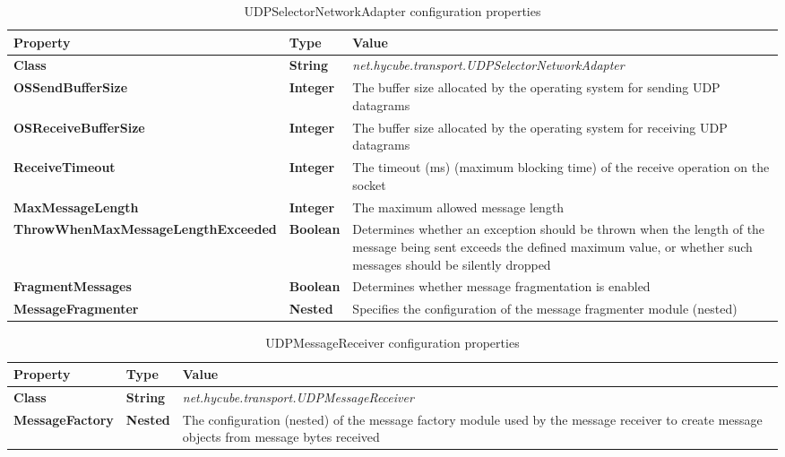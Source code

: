 \begin{table}
\scriptsize
\begin{center}
\begin{tabular}{p{5.0cm} p{1.0cm} p{8.5cm}}
	\hline
	\textbf{Property}							& \textbf{Type}					& \textbf{Value}					\\[1mm]
    \hline
	\textbf{Class}								& \textbf{String}				& \textit{net.hycube.transport.UDPSelectorNetworkAdapter}							\\[1.5mm]	
	\textbf{OSSendBufferSize}					& \textbf{Integer}				& The buffer size allocated by the operating system for sending UDP datagrams		\\[1.5mm]	
	\textbf{OSReceiveBufferSize}				& \textbf{Integer}				& The buffer size allocated by the operating system for receiving UDP datagrams		\\[1.5mm]	
	\textbf{ReceiveTimeout}						& \textbf{Integer}				& The timeout (ms) (maximum blocking time) of the receive operation on the socket		\\[1.5mm]	
	\textbf{MaxMessageLength}					& \textbf{Integer}				& The maximum allowed message length												\\[1.5mm]	
	\textbf{ThrowWhenMaxMessageLengthExceeded}	& \textbf{Boolean}				& Determines whether an exception should be thrown when the length of the message being sent exceeds the defined maximum value, or whether such messages should be silently dropped		\\[1.5mm]	
	\textbf{FragmentMessages}					& \textbf{Boolean}				& Determines whether message fragmentation is enabled		\\[1.5mm]	
	\textbf{MessageFragmenter}					& \textbf{Nested}				& Specifies the configuration of the message fragmenter module (nested)				\\[1.5mm]	
    \hline
\end{tabular}
\end{center}
\caption{UDPSelectorNetworkAdapter configuration properties}
\label{tab:libUDPSelectorNetworkAdapter}
\end{table}




\begin{table}
\scriptsize
\begin{center}
\begin{tabular}{p{5.0cm} p{1.0cm} p{8.5cm}}
	\hline
	\textbf{Property}							& \textbf{Type}					& \textbf{Value}					\\[1mm]
    \hline
	\textbf{Class}								& \textbf{String}				& \textit{net.hycube.transport.UDPMessageReceiver}							\\[1.5mm]	
	\textbf{MessageFactory}						& \textbf{Nested}				& The configuration (nested) of the message factory module used by the message receiver to create message objects from message bytes received 			\\[1.5mm]	
    \hline
\end{tabular}
\end{center}
\caption{UDPMessageReceiver configuration properties}
\label{tab:libUDPMessageReceiver}
\end{table}

